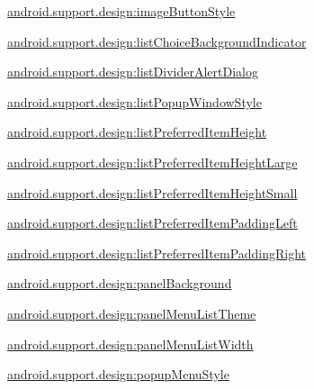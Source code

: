 {\ttfamily \hyperlink{classandroid_1_1support_1_1design_1_1R_1_1styleable_ac6d297b6830e11aed44a3f4f6ae32e54}{android.\+support.\+design\+:image\+Button\+Style}}

{\ttfamily \hyperlink{classandroid_1_1support_1_1design_1_1R_1_1styleable_a1818805fc2d169ac39a9c5c20b3cec4f}{android.\+support.\+design\+:list\+Choice\+Background\+Indicator}}

{\ttfamily \hyperlink{classandroid_1_1support_1_1design_1_1R_1_1styleable_a05b88d6115e3a28d5aa99a5d7c9aaace}{android.\+support.\+design\+:list\+Divider\+Alert\+Dialog}}

{\ttfamily \hyperlink{classandroid_1_1support_1_1design_1_1R_1_1styleable_ab38358b7c84d4dbc393c9808d07c0427}{android.\+support.\+design\+:list\+Popup\+Window\+Style}}

{\ttfamily \hyperlink{classandroid_1_1support_1_1design_1_1R_1_1styleable_a8cff2e543a4edae5b403be6bb3c47eec}{android.\+support.\+design\+:list\+Preferred\+Item\+Height}}

{\ttfamily \hyperlink{classandroid_1_1support_1_1design_1_1R_1_1styleable_a183ea7959584cc75c934bead3330b82a}{android.\+support.\+design\+:list\+Preferred\+Item\+Height\+Large}}

{\ttfamily \hyperlink{classandroid_1_1support_1_1design_1_1R_1_1styleable_a3fb383aca061541233e8348ffa9b12fc}{android.\+support.\+design\+:list\+Preferred\+Item\+Height\+Small}}

{\ttfamily \hyperlink{classandroid_1_1support_1_1design_1_1R_1_1styleable_abd5288e1dbcfcf3972724d7aded718da}{android.\+support.\+design\+:list\+Preferred\+Item\+Padding\+Left}}

{\ttfamily \hyperlink{classandroid_1_1support_1_1design_1_1R_1_1styleable_a88a4a9392e587ed500ccdae581df5835}{android.\+support.\+design\+:list\+Preferred\+Item\+Padding\+Right}}

{\ttfamily \hyperlink{classandroid_1_1support_1_1design_1_1R_1_1styleable_a29b397614d1d7cf59c6c120c90e3b529}{android.\+support.\+design\+:panel\+Background}}

{\ttfamily \hyperlink{classandroid_1_1support_1_1design_1_1R_1_1styleable_a8c51cf0e087c4190c18f5548d4dfad15}{android.\+support.\+design\+:panel\+Menu\+List\+Theme}}

{\ttfamily \hyperlink{classandroid_1_1support_1_1design_1_1R_1_1styleable_aeff64b02915a67a11df8dde49e714e6d}{android.\+support.\+design\+:panel\+Menu\+List\+Width}}

{\ttfamily \hyperlink{classandroid_1_1support_1_1design_1_1R_1_1styleable_a98dfd09dfbb476ddbf9036698ee8bf9c}{android.\+support.\+design\+:popup\+Menu\+Style}}

